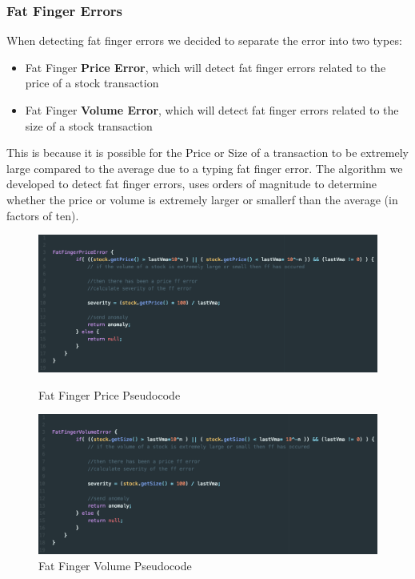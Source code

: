 \documentclass[12pt]{article}
\begin{document}
    \subsubsection{Fat Finger Errors}
    When detecting fat finger errors we decided to separate the error into two types:
    \begin{itemize}
      \item Fat Finger \textbf{Price Error}, which will detect fat finger errors related to the price of a stock transaction
      \item Fat Finger \textbf{Volume Error}, which will detect fat finger errors related to the size of a stock transaction
    \end{itemize}
    This is because it is possible for the Price or Size of a transaction to be extremely large compared to the average due to a typing fat finger error.
    The algorithm we developed to detect fat finger errors, uses orders of magnitude to determine whether the price or volume is extremely larger or smallerf than the average (in factors of ten).
    \begin{figure}[H]
      \centering
      \begin{minipage}[H]{0.9\textwidth}
        \includegraphics[width=\textwidth]{FFprice.png}
        \caption{Fat Finger Price Pseudocode}
      \end{minipage}
      \begin{minipage}[H]{0.9\textwidth}
        \includegraphics[width=\textwidth]{FFvolume.png}
        \caption{Fat Finger Volume Pseudocode}
      \end{minipage}
    \end{figure}
\newpage
\end{document}
